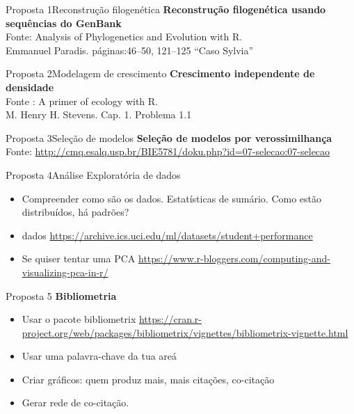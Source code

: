 \documentclass[handout]{beamer}
\begin{document}
\begin{frame}{Proposta 1}{Reconstrução filogenética}
\textbf{Reconstrução filogenética usando sequências do GenBank}\\
   Fonte:  Analysis of Phylogenetics and Evolution with R.\\
           Emmanuel Paradis. páginas:46--50, 121--125 ``Caso Sylvia''
           \begin{center}
             \end{center}
 
\end{frame}
\begin{frame}{Proposta 2}{Modelagem de crescimento}
\textbf{Crescimento independente de densidade} \\
    Fonte : A primer of ecology with R.\\
          M. Henry H. Stevens. Cap. 1. Problema 1.1 
   
\end{frame}

\begin{frame}{Proposta 3}{Seleção de modelos}
\textbf{Seleção de modelos por verossimilhança}\\
   Fonte: \url{http://cmq.esalq.usp.br/BIE5781/doku.php?id=07-selecao:07-selecao}  
\end{frame}


\begin{frame}{Proposta 4}{Análise Exploratória de dados}


\begin{itemize}
\item Compreender como são os dados. Estatísticas de sumário. Como estão distribuídos, há padrões?
\item dados \url{https://archive.ics.uci.edu/ml/datasets/student+performance}

  
\item  Se quiser tentar uma PCA \url{https://www.r-bloggers.com/computing-and-visualizing-pca-in-r/}
\end{itemize}
\end{frame}

\begin{frame}{Proposta 5}
  \textbf{Bibliometria}\\

  \begin{itemize}
  \item Usar o pacote bibliometrix \url{https://cran.r-project.org/web/packages/bibliometrix/vignettes/bibliometrix-vignette.html}
    
  \item Usar uma palavra-chave da tua areá
  \item Criar gráficos: quem produz mais, mais citações, co-citação 
  \item Gerar rede de co-citação.
    \end{itemize}

  
  \end{frame}
\end{document}
